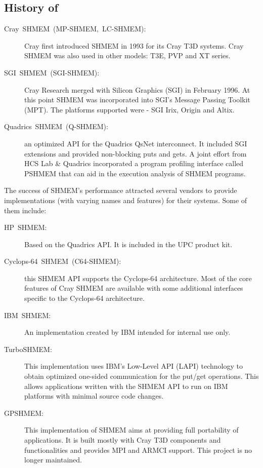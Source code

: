 \subsection{History of \openshmem}
\begin{description}
\item [{{Cray~SHMEM~(MP-SHMEM,~LC-SHMEM):}}] Cray first introduced
SHMEM in 1993 for its Cray T3D systems. Cray SHMEM was also used in
other models: T3E, PVP and XT series. 
\item [{{SGI~SHMEM~(SGI-SHMEM):}}] Cray Research merged with Silicon
Graphics (SGI) in February 1996. At this point SHMEM was incorporated
into SGI's Message Passing Toolkit (MPT). The platforms supported
were - SGI Irix, Origin and Altix. 
\item [{{Quadrics~SHMEM~(Q-SHMEM):}}] an optimized API for the Quadrics
QsNet interconnect. It included SGI extensions and provided non-blocking
puts and gets. A joint effort from HCS Lab \& Quadrics incorporated
a program profiling interface called PSHMEM that can aid in the execution
analysis of SHMEM programs. 
\end{description}
The success of SHMEM's performance attracted several vendors to provide
implementations (with varying names and features) for their systems.
Some of them include: 
\begin{description}
\item [{{HP~SHMEM:}}] Based on the Quadrics API. It is included in the
UPC product kit. 
\item [{{Cyclops-64~SHMEM~(C64-SHMEM):}}] this SHMEM API supports the
Cyclops-64 architecture. Most of the core features of Cray SHMEM are
available with some additional interfaces specific to the Cyclops-64
architecture. %

\item [{{IBM~SHMEM:}}] An implementation created by IBM intended for
internal use only. 
\item [{{TurboSHMEM:}}] This implementation uses IBM's Low-Level API
(LAPI) technology to obtain optimized one-sided communication for
the put/get operations. This allows applications written with the
SHMEM API to run on IBM platforms with minimal source code changes. 
\item [{{GPSHMEM:}}] This implementation of SHMEM aims at providing full
portability of applications. It is built mostly with Cray T3D components
and functionalities and provides MPI and ARMCI support. This project
is no longer maintained. \end{description}
